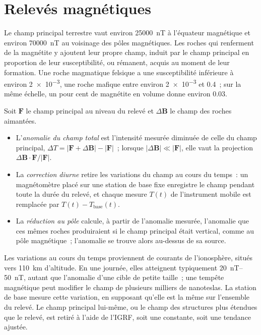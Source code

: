 \section{Relevés magnétiques}\label{sec:b3:field-lab-methods-3:magnetics}

Le champ principal terrestre vaut environ \qty{25000}{nT} à l'équateur
magnétique et environ \qty{70000}{nT} au voisinage des pôles magnétiques. Les
roches qui renferment de la magnétite y ajoutent leur propre champ, induit par
le champ principal en proportion de leur susceptibilité, ou rémanent, acquis
au moment de leur formation. Une roche magmatique felsique a une susceptibilité
inférieure à environ \num{2e-3}, une roche mafique entre environ \num{2e-3} et
\num{0.4}~; sur la même échelle, un pour cent de magnétite en volume donne environ \num{0.03}.

\begin{definition}\label{def:b3:field-lab-methods-3:magnetic}
Soit $\mathbf{F}$ le champ principal au niveau du relevé et $\Delta\mathbf{B}$
le champ des roches aimantées.
\begin{itemize}
  \item L'\emph{anomalie du champ total} est
        l'intensité mesurée diminuée de celle du champ principal, $\Delta T =
        |\mathbf{F} + \Delta\mathbf{B}| - |\mathbf{F}|$~; lorsque
        $|\Delta\mathbf{B}| \ll |\mathbf{F}|$, elle vaut la projection
        $\Delta\mathbf{B}\cdot\mathbf{F}/|\mathbf{F}|$.
  \item La \emph{correction diurne} retire les
        variations du champ au cours du temps~: un magnétomètre placé sur une
        station de base fixe enregistre le champ pendant toute la durée du relevé, et chaque
        mesure $T(t)$ de l'instrument mobile est remplacée par $T(t) -
        T_\mathrm{base}(t)$.
  \item La \emph{réduction au pôle}
        calcule, à partir de l'anomalie mesurée, l'anomalie que ces mêmes
        roches produiraient si le champ principal était vertical, comme au
        pôle magnétique~; l'anomalie se trouve alors au-dessus de sa source.
\end{itemize}
\end{definition}

Les variations au cours du temps proviennent de courants de l'ionosphère, situés
vers \qty{110}{km} d'altitude. En une journée, elles atteignent typiquement
\qtyrange{20}{50}{nT}, autant que l'anomalie d'une cible de petite taille~; une
tempête magnétique peut modifier le champ de plusieurs milliers de nanoteslas.
La station de base mesure cette variation, en supposant qu'elle est la même sur
l'ensemble du relevé. Le champ principal lui-même, ou le champ des structures
plus étendues que le relevé, est retiré à l'aide de l'IGRF, soit une constante,
soit une tendance ajustée.

